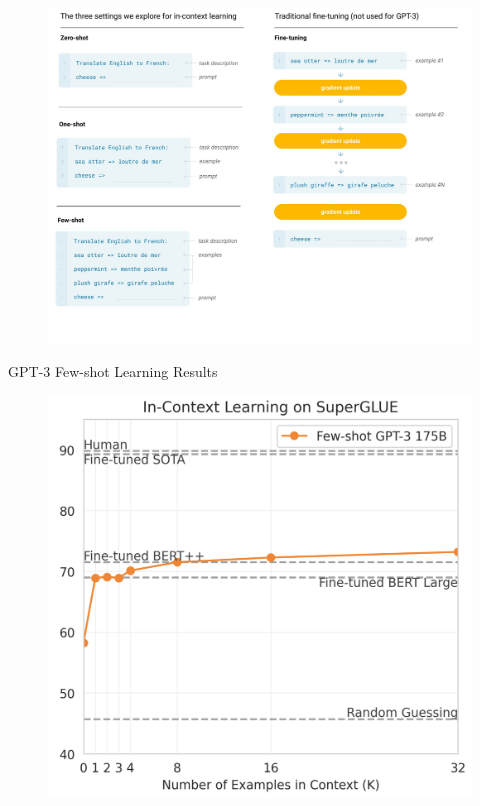  \begin{figure}[h]
        	\includegraphics[scale = 0.18]{pics/zeroonefew.png}
        \end{figure}  



GPT-3 Few-shot Learning Results
 \begin{figure}[h]
        	\includegraphics[scale = 0.15]{pics/fewshotresults.png}
        \end{figure}




